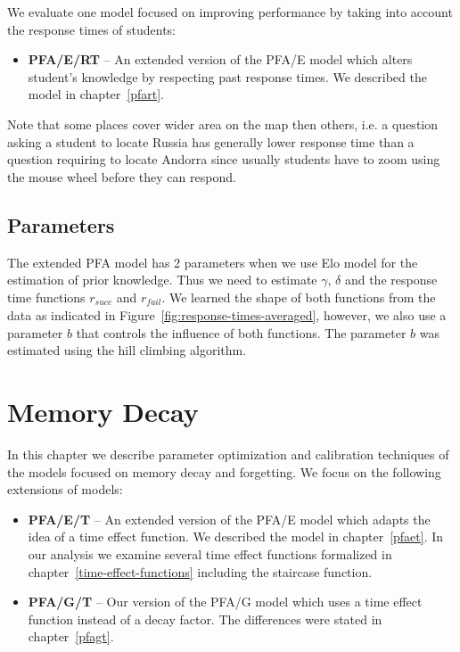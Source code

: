 We evaluate one model focused on improving performance by taking into account the response times of students:

\begin{itemize}
  \item \textbf{PFA/E/RT} -- An extended version of the PFA/E model which alters student's knowledge by respecting past response times. We described the model in chapter~\ref{pfart}.
\end{itemize}

Note that some places cover wider area on the map then others, i.e. a question asking a student to locate Russia has generally lower response time than a question requiring to locate Andorra since usually students have to zoom using the mouse wheel before they can respond.

\subsection{Parameters}
\label{response-parameters}

The extended PFA model has 2 parameters when we use Elo model for the estimation of prior knowledge. Thus we need to estimate $\gamma$, $\delta$ and the response time functions $r_{\mathit{succ}}$ and $r_{\mathit{fail}}$. We learned the shape of both functions from the data as indicated in Figure~\ref{fig:response-times-averaged}, however, we also use a parameter $b$ that controls the influence of both functions. The parameter $b$ was estimated using the hill climbing algorithm.

\section{Memory Decay}

In this chapter we describe parameter optimization and calibration techniques of the models focused on memory decay and forgetting. We focus on the following extensions of models:

\begin{itemize}
  \item \textbf{PFA/E/T} -- An extended version of the PFA/E model which adapts the idea of a time effect function. We described the model in chapter~\ref{pfaet}. In our analysis we examine several time effect functions formalized in chapter~\ref{time-effect-functions} including the staircase function.
  \item \textbf{PFA/G/T} -- Our version of the PFA/G model which uses a time effect function instead of a decay factor. The differences were stated in chapter~\ref{pfagt}.
\end{itemize}

